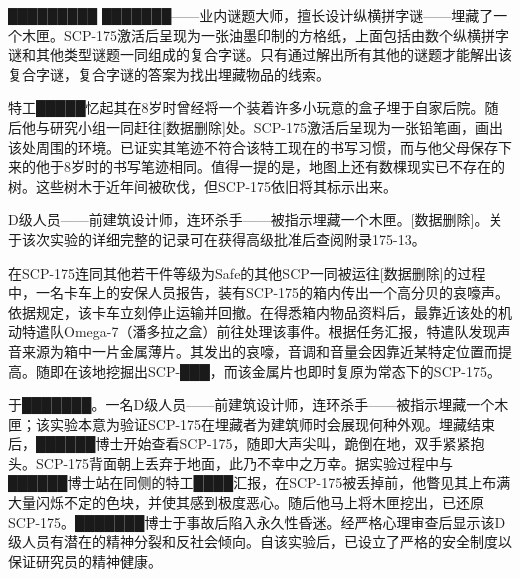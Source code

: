 █████████ ███████——业内谜题大师，擅长设计纵横拼字谜——埋藏了一个木匣。SCP-175激活后呈现为一张油墨印制的方格纸，上面包括由数个纵横拼字谜和其他类型谜题一同组成的复合字谜。只有通过解出所有其他的谜题才能解出该复合字谜，复合字谜的答案为找出埋藏物品的线索。

特工█████忆起其在8岁时曾经将一个装着许多小玩意的盒子埋于自家后院。随后他与研究小组一同赶往{[}数据删除]处。SCP-175激活后呈现为一张铅笔画，画出该处周围的环境。已证实其笔迹不符合该特工现在的书写习惯，而与他父母保存下来的他于8岁时的书写笔迹相同。值得一提的是，地图上还有数棵现实已不存在的树。这些树木于近年间被砍伐，但SCP-175依旧将其标示出来。

D级人员——前建筑设计师，连环杀手——被指示埋藏一个木匣。{[}数据删除]。关于该次实验的详细完整的记录可在获得高级批准后查阅附录175-13。

在SCP-175连同其他若干件等级为Safe的其他SCP一同被运往{[}数据删除]的过程中，一名卡车上的安保人员报告，装有SCP-175的箱内传出一个高分贝的哀嚎声。依据规定，该卡车立刻停止运输并回撤。在得悉箱内物品资料后，最靠近该处的机动特遣队Omega-7（潘多拉之盒）前往处理该事件。根据任务汇报，特遣队发现声音来源为箱中一片金属薄片。其发出的哀嚎，音调和音量会因靠近某特定位置而提高。随即在该地挖掘出SCP-███，而该金属片也即时复原为常态下的SCP-175。

于███████。一名D级人员——前建筑设计师，连环杀手——被指示埋藏一个木匣；该实验本意为验证SCP-175在埋藏者为建筑师时会展现何种外观。埋藏结束后，██████博士开始查看SCP-175，随即大声尖叫，跪倒在地，双手紧紧抱头。SCP-175背面朝上丢弃于地面，此乃不幸中之万幸。据实验过程中与██████博士站在同侧的特工████汇报，在SCP-175被丢掉前，他瞥见其上布满大量闪烁不定的色块，并使其感到极度恶心。随后他马上将木匣挖出，已还原SCP-175。███████博士于事故后陷入永久性昏迷。经严格心理审查后显示该D级人员有潜在的精神分裂和反社会倾向。自该实验后，已设立了严格的安全制度以保证研究员的精神健康。
